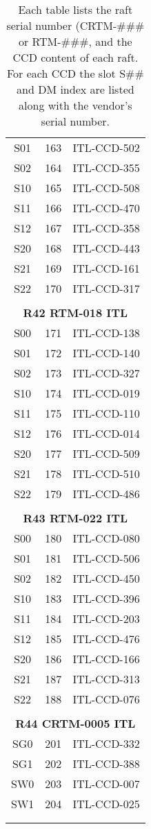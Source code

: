 \begin{longtable}{ccc}
  S01 & 163 & ITL-CCD-502 \\
  S02 & 164 & ITL-CCD-355 \\
  S10 & 165 & ITL-CCD-508 \\
  S11 & 166 & ITL-CCD-470 \\
  S12 & 167 & ITL-CCD-358 \\
  S20 & 168 & ITL-CCD-443 \\
  S21 & 169 & ITL-CCD-161 \\
  S22 & 170 & ITL-CCD-317 \\
 & & \\
\multicolumn{3}{c}{\bf R42  RTM-018  ITL} \\
\hline
  S00 & 171 & ITL-CCD-138 \\
  S01 & 172 & ITL-CCD-140 \\
  S02 & 173 & ITL-CCD-327 \\
  S10 & 174 & ITL-CCD-019 \\
  S11 & 175 & ITL-CCD-110 \\
  S12 & 176 & ITL-CCD-014 \\
  S20 & 177 & ITL-CCD-509 \\
  S21 & 178 & ITL-CCD-510 \\
  S22 & 179 & ITL-CCD-486 \\
 & & \\
\multicolumn{3}{c}{\bf R43  RTM-022  ITL} \\
\hline
  S00 & 180 & ITL-CCD-080 \\
  S01 & 181 & ITL-CCD-506 \\
  S02 & 182 & ITL-CCD-450 \\
  S10 & 183 & ITL-CCD-396 \\
  S11 & 184 & ITL-CCD-203 \\
  S12 & 185 & ITL-CCD-476 \\
  S20 & 186 & ITL-CCD-166 \\
  S21 & 187 & ITL-CCD-313 \\
  S22 & 188 & ITL-CCD-076 \\
 & & \\
\multicolumn{3}{c}{\bf R44  CRTM-0005  ITL} \\
\hline
  SG0 & 201 & ITL-CCD-332 \\
  SG1 & 202 & ITL-CCD-388 \\
  SW0 & 203 & ITL-CCD-007 \\
  SW1 & 204 & ITL-CCD-025 \\
 & & \\

    \caption{Each table lists the raft serial number (CRTM-\#\#\# or RTM-\#\#\#, and the CCD content of each raft.  For each CCD the slot S\#\# and DM index are listed along with the vendor's serial number.}
   \label{tab:mapping}
\end{longtable}